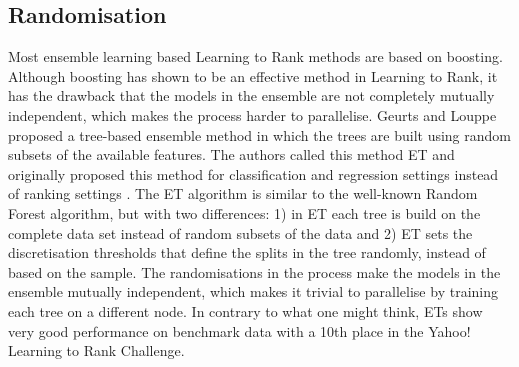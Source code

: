 \subsection{Randomisation}
Most ensemble learning based Learning to Rank methods are based on boosting. Although boosting has shown to be an effective method in Learning to Rank, it has the drawback that the models in the ensemble are not completely mutually independent, which makes the process harder to parallelise. Geurts and Louppe \cite{Geurts2011} proposed a tree-based ensemble method in which the trees are built using random subsets of the available features. The authors called this method \ac{ET} and originally proposed this method for classification and regression settings instead of ranking settings \cite{Geurts2006}. The \ac{ET} algorithm is similar to the well-known Random Forest algorithm, but with two differences: 1) in \ac{ET} each tree is build on the complete data set instead of random subsets of the data and 2) \ac{ET} sets the discretisation thresholds that define the splits in the tree randomly, instead of based on the sample. The randomisations in the process make the models in the ensemble mutually independent, which makes it trivial to parallelise by training each tree on a different node. In contrary to what one might think, \ac{ET}s show very good performance on benchmark data with a 10th place in the Yahoo! Learning to Rank Challenge.\\
